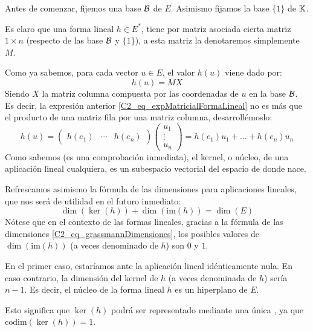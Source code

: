 Antes de comenzar, fijemos una base $\mathcal{B}$ de $E$. Asimismo fijamos la base $\{1\}$ de $\mathbb{K}$.

Es claro que una forma lineal $h\in E^*$, tiene por matriz asociada cierta matriz $1\times n$ (respecto de las base $\mathcal{B}$ y $\{1\}$), a esta matriz la  denotaremos símplemente $M$.

Como ya sabemos, para cada vector $u\in E$, el valor $h(u)$ viene dado por:
\begin{equation}
	\label{C2_eq_expMatricialFormaLineal}
	h(u)=MX	
\end{equation}
Siendo $X$ la matriz columna compuesta por las coordenadas de $u$ en la base $\mathcal{B}$. Es decir, la expresión anterior \eqref{C2_eq_expMatricialFormaLineal} no es más que el producto de una matriz fila por una matriz columna, desarrollémoslo:
\begin{equation}
	\label{C2_eq_expMatricialFormaLinealExpandida}
	h(u)=\begin{pmatrix}
	h(e_1) & \cdots & h(e_n)
	\end{pmatrix}\begin{pmatrix}
	u_1\\
	\vdots\\
	u_n
	\end{pmatrix}=h(e_1)u_1+\dots+h(e_n)u_n
\end{equation}
Como sabemos (es una comprobación inmediata), el kernel, o núcleo, de una aplicación lineal cualquiera, es un subespacio vectorial del espacio de donde nace.

Refrescamos asimismo la fórmula de las dimensiones para aplicaciones lineales, que nos será de utilidad en el futuro inmediato:
\begin{equation}
	\label{C2_eq_grassmannDimensiones}
	\dim(\ker(h))+\dim(\mathrm{im}(h))=\dim(E)
\end{equation}
Nótese que en el contexto de las formas lineales, gracias a la fórmula de las dimensiones \eqref{C2_eq_grassmannDimensiones}, los posibles valores de $\dim(\mathrm{im}(h))$ (a veces denominado  de $h$) son $0$ y $1$. 

En el primer caso, estaríamos ante la aplicación lineal idénticamente nula. En caso contrario, la dimensión del kernel de $h$ (a veces denominada  de $h$) sería $n-1$. Es decir, el núcleo de la forma lineal $h$ es un hiperplano de $E$.

Esto significa que $\ker(h)$ podrá ser representado mediante una única , ya que $\mathrm{codim}(\ker(h))=1$.


